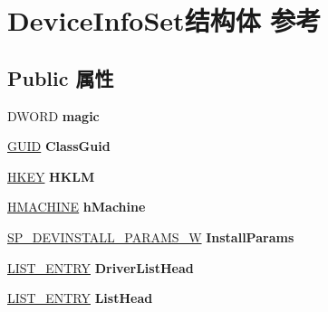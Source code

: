 \hypertarget{struct_device_info_set}{}\section{Device\+Info\+Set结构体 参考}
\label{struct_device_info_set}
\subsection*{Public 属性}
\begin{DoxyCompactItemize}
\item 
\mbox{\label{struct_device_info_set_a2a3eee1d3db31c05dff1d880ab21b270}} 
D\+W\+O\+RD {\bfseries magic}
\item 
\mbox{\label{struct_device_info_set_a8cf99b6a2703fa85f35290f08a8402fd}} 
\hyperlink{interface_g_u_i_d}{G\+U\+ID} {\bfseries Class\+Guid}
\item 
\mbox{\label{struct_device_info_set_a4bf757ba8e28b2bf80bb15fb0d189a6d}} 
\hyperlink{interfacevoid}{H\+K\+EY} {\bfseries H\+K\+LM}
\item 
\mbox{\label{struct_device_info_set_a59cdf430ca8a3afbc53454761f430454}} 
\hyperlink{interfacevoid}{H\+M\+A\+C\+H\+I\+NE} {\bfseries h\+Machine}
\item 
\mbox{\label{struct_device_info_set_a2fc0cb23f55dd6062d99ecbb72f704f3}} 
\hyperlink{struct___s_p___d_e_v_i_n_s_t_a_l_l___p_a_r_a_m_s___w}{S\+P\+\_\+\+D\+E\+V\+I\+N\+S\+T\+A\+L\+L\+\_\+\+P\+A\+R\+A\+M\+S\+\_\+W} {\bfseries Install\+Params}
\item 
\mbox{\label{struct_device_info_set_a367565a676ac3df9225ff7311cac6f9e}} 
\hyperlink{struct___l_i_s_t___e_n_t_r_y}{L\+I\+S\+T\+\_\+\+E\+N\+T\+RY} {\bfseries Driver\+List\+Head}
\item 
\mbox{\label{struct_device_info_set_a644613a2087aaad2193d9ef601c630f3}} 
\hyperlink{struct___l_i_s_t___e_n_t_r_y}{L\+I\+S\+T\+\_\+\+E\+N\+T\+RY} {\bfseries List\+Head}
\item 
\mbox{\label{struct_device_info_set_ae2ae62a36fa14592dfcbcfbaeab997b7}} 

\end{DoxyCompactItemize}
